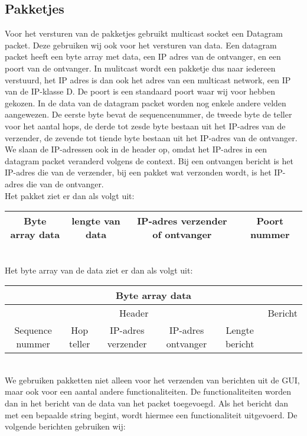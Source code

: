 \documentclass{article}
\begin{document}
\subsection{Pakketjes}
Voor het versturen van de pakketjes gebruikt multicast socket een Datagram packet. Deze gebruiken wij ook voor het versturen van data. Een datagram packet heeft een byte array met data, een IP adres van de ontvanger, en een poort van de ontvanger. In mulitcast wordt een pakketje dus naar iedereen verstuurd, het IP adres is dan ook het adres van een multicast network, een IP van de IP-klasse D. De poort is een standaard poort waar wij voor hebben gekozen. In de data van de datagram packet worden nog enkele andere velden aangewezen. De eerste byte bevat de sequencenummer, de tweede byte de teller voor het aantal hops, de derde tot zesde byte bestaan uit het IP-adres van de verzender, de zevende tot tiende byte bestaan uit het IP-adres van de ontvanger. We slaan de IP-adressen ook in de header op, omdat het IP-adres in een datagram packet veranderd volgens de context. Bij een ontvangen bericht is het IP-adres die van de verzender, bij een pakket wat verzonden wordt, is het IP-adres die van de ontvanger. \\


\noindent Het pakket ziet er dan als volgt uit:
\\
\begin{tabular}{|c|c|c|c|}
\hline
Byte array data & lengte van data & IP-adres verzender of ontvanger & Poort nummer \\
\hline
\end{tabular}
\\

\noindent Het byte array van de data ziet er dan als volgt uit:
\\
\begin{tabular}{| c | c | c | c | c c |}
\hline
\multicolumn{6}{|c|}{Byte array data}  \\
\hline
\multicolumn{5}{|c|}{Header} & Bericht \\
\hline
Sequence nummer & Hop teller & IP-adres verzender & IP-adres ontvanger & Lengte bericht &\phantom{bericht} \\
\hline
\end{tabular}
\\

\noindent We gebruiken pakketten niet alleen voor het verzenden van berichten uit de GUI, maar ook voor een aantal andere functionaliteiten. De functionaliteiten worden dan in het bericht van de data van het packet toegevoegd. Als het bericht dan met een bepaalde string begint, wordt hiermee een functionaliteit uitgevoerd. De volgende berichten gebruiken wij:
\\
\end{document}
